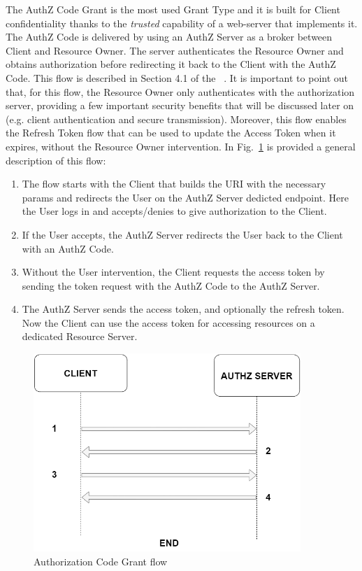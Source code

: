 The AuthZ Code Grant is the most used Grant Type and it is built for Client confidentiality thanks to the \textit{trusted} capability of a web-server that implements it. The AuthZ Code is delivered by using an AuthZ Server as a broker between Client and Resource Owner. The server authenticates the Resource Owner and obtains authorization before redirecting it back to the Client with the AuthZ Code. This flow is described in Section 4.1 of the \ \cite{RFC6749}. It is important to point out that, for this flow, the Resource Owner only authenticates with the authorization server, providing a few important security benefits that will be discussed later on (e.g. client authentication and secure transmission). Moreover, this flow enables the Refresh Token flow that can be used to update the Access Token when it expires, without the Resource Owner intervention. In Fig.~\ref{fig:serverflow} is provided a general description of this flow:

\begin{enumerate}
    \item The flow starts with the Client that builds the URI with the necessary params and redirects the User on the AuthZ Server dedicted endpoint. Here the User logs in and accepts/denies to give authorization to the Client. 
    
    \item If the User accepts, the AuthZ Server redirects the User back to the Client with an AuthZ Code.
    
    \item Without the User intervention, the Client requests the access token by sending the token request with the AuthZ Code to the AuthZ Server.
    
    \item The AuthZ Server sends the access token, and optionally the refresh token. Now the Client can use the access token for accessing resources on a dedicated Resource Server.
\end{enumerate}

\begin{figure}[htbp]
    \centering
    \includegraphics[width=0.9\textwidth]{chapters/images/chp2/server_flow_general.png}
    \caption{Authorization Code Grant flow}
    \label{fig:serverflow}
\end{figure}

